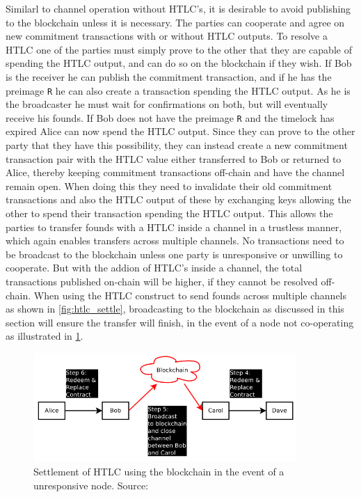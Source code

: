 Similarl to channel operation without HTLC's, it is desirable to avoid publishing to the blockchain unless it is necessary. The parties can cooperate and agree on new commitment transactions with or without HTLC outputs. To resolve a HTLC one of the parties must simply prove to the other that they are capable of spending the HTLC output, and can do so on the blockchain if they wish. If Bob is the receiver he can publish the commitment transaction, and if he has the preimage {\tt R} he can also create a transaction spending the HTLC output. As he is the broadcaster he must wait for confirmations on both, but will eventually receive his founds. If Bob does not have the preimage {\tt R} and the timelock has expired Alice can now spend the HTLC output. Since they can prove to the other party that they have this possibility, they can instead create a new commitment transaction pair with the HTLC value either transferred to Bob or returned to Alice, thereby keeping  commitment transactions off-chain and have the channel remain open. When doing this they need to invalidate their old commitment transactions and also the HTLC output of these by exchanging keys allowing the other to spend their transaction spending the HTLC output. This allows the parties to transfer founds with a HTLC inside a channel in a trustless manner, which again enables transfers across multiple channels.
No transactions need to be broadcast to the blockchain unless one party is unresponsive or unwilling to cooperate. But with the addion of HTLC's inside a channel, the total transactions published on-chain will be higher, if they cannot be resolved off-chain.
When using the HTLC construct to send founds across multiple channels as shown in \cref{fig:htlc_settle}, broadcasting to the blockchain as discussed in this section will ensure the transfer will finish, in the event of a node not co-operating as illustrated in \cref{fig:htlc_bc}.

\begin{figure}[ht]
    \centering
    \includegraphics[width=10cm]{figures/htlc_bc.png}
    \caption{Settlement of HTLC using the blockchain in the event of a unresponsive node. Source:~\cite{poon2015bitcoin}}
    \label{fig:htlc_bc}
\end{figure}

